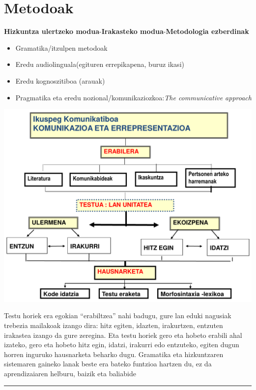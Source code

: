 \documentclass[]{book}
\providecommand{\tightlist}{%
  \setlength{\itemsep}{0pt}\setlength{\parskip}{0pt}}
\begin{document}
\hypertarget{metodoak}{%
\section{Metodoak}\label{metodoak}}

\textbf{Hizkuntza ulertzeko modua}-\textbf{Irakasteko modua}-\textbf{Metodologia ezberdinak}

\begin{itemize}
\tightlist
\item
  Gramatika/itzulpen metodoak
\item
  Eredu audiolinguala(egituren errepikapena, buruz ikasi)
\item
  Eredu kognoszitiboa (arauak)
\item
  Pragmatika eta eredu nozional/komunikaziozkoa:\emph{The communicative approach}
\end{itemize}

\includegraphics{assets/01_03-HD.png}

Testu horiek era egokian ``erabiltzea'' nahi badugu, gure lan eduki nagusiak trebezia mailakoak izango dira: hitz egiten, idazten, irakurtzen, entzuten irakastea izango da gure zeregina.
Eta testu horiek gero eta hobeto erabili ahal izateko, gero eta hobeto hitz egin, idatzi, irakurri edo entzuteko, egiten dugun horren inguruko hausnarketa beharko dugu. Gramatika eta hizkuntzaren sistemaren gaineko lanak beste era bateko funtzioa hartzen du, ez da aprendizaiaren helburu, baizik eta baliabide

\begin{center}\rule{0.5\linewidth}{\linethickness}\end{center}
\end{document}
